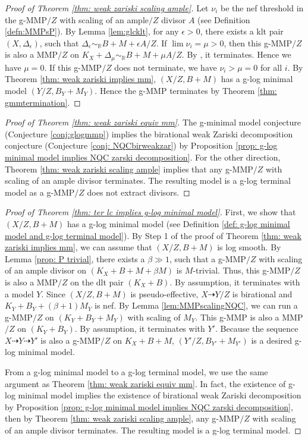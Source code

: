 \documentclass[11pt]{amsart}
\newcommand{\Rr}{\mathbb{R}}
\begin{document}
\begin{proof}[Proof of Theorem \ref{thm: weak zariski scaling ample}]
	Let  $\nu_i$ be the nef threshold in the g-MMP$/Z$ with scaling of an ample$/Z$ divisor $A$ (see Definition \ref{defn:MMPsP}). By Lemma \ref{lem:glcklt}, for any $\epsilon>0$, there exists a klt pair $(X,\Delta_{\epsilon})$, such that $\Delta_{\epsilon}\sim_{\Rr} B+M+\epsilon A/Z$. If $\lim \nu_i = \mu>0$, then this g-MMP$/Z$ is also a MMP$/Z$ on $K_X+\Delta_{\mu} \sim_\Rr B+M+\mu A/Z$. By \cite[Corollary 1.4.2]{BCHM10}, it terminates. Hence we have $\mu=0$. If this g-MMP$/Z$ does not terminate, we have $\nu_i>\mu=0$ for all $i$. By Theorem \ref{thm: weak zariski implies mm}, $(X/Z,B+M)$ has a g-log minimal model $(Y/Z,B_Y+M_Y)$. Hence the g-MMP terminates by Theorem \ref{thm: gmmtermination}.
\end{proof}

\begin{proof}[Proof of Theorem \ref{thm: weak zariski equiv mm}]
The g-minimal model conjecture (Conjecture \ref{conj:glogmmp}) implies the birational weak Zariski decomposition conjecture (Conjecture \ref{conj: NQCbirweakzar}) by Proposition \ref{prop: g-log minimal model implies NQC zarski decomposition}. For the other direction, Theorem \ref{thm: weak zariski scaling ample} implies that any g-MMP$/Z$ with scaling of an ample divisor terminates. The resulting model is a g-log terminal model as a g-MMP$/Z$ does not extract divisors.
\end{proof}

\begin{proof}[Proof of Theorem \ref{thm: ter lc implies g-log minimal model}] First, we show that $(X/Z,B+M)$ has a g-log minimal model (see Definition \ref{def: g-log minimal model and g-log terminal model}). By Step 1 of the proof of Theorem \ref{thm: weak zariski implies mm}, we can assume that $(X/Z,B+M)$ is log smooth. By Lemma \ref{prop: P trivial}, there exists a $\beta \gg1$, such that a g-MMP$/Z$ with scaling of an ample divisor on $(K_X+B+M+\beta M)$ is $M$-trivial. Thus, this g-MMP$/Z$ is also a MMP$/Z$ on the dlt pair $(K_X+B)$. By assumption, it terminates with a model $Y$. Since $(X/Z,B+M)$ is pseudo-effective, $X\dashrightarrow Y/Z$ is birational and $K_Y+B_Y+(\beta+1) M_Y$ is nef. By Lemma \ref{lem:MMPscalingNQC}, we can run a g-MMP$/Z$ on $(K_Y+B_Y+M_Y)$ with scaling of $M_Y$. This g-MMP is also a MMP$/Z$ on $(K_Y+B_Y)$. By assumption, it terminates with $Y'$.      Because the sequence $X \dashrightarrow Y \dashrightarrow Y'$ is also a g-MMP$/Z$ on $K_X+B+M$, $(Y'/Z,B_{Y'}+M_{Y'})$ is a desired g-log minimal model.
	
From a g-log minimal model to a g-log terminal model, we use the same argument as Theorem \ref{thm: weak zariski equiv mm}. In fact, the existence of g-log minimal model implies the existence of birational weak Zariski decomposition by Proposition \ref{prop: g-log minimal model implies NQC zarski decomposition}, then by Theorem \ref{thm: weak zariski scaling ample}, any g-MMP$/Z$ with scaling of an ample divisor terminates. The resulting model is a g-log terminal model.
\end{proof}
\end{document}
